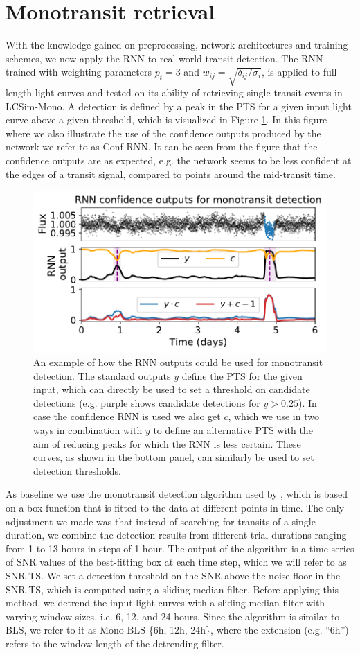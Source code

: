 \section{Monotransit retrieval}
\label{sec:monos}

With the knowledge gained on preprocessing, network architectures and training schemes, we now apply the RNN to real-world transit detection. The RNN trained with weighting parameters $p_t=3$ and $w_{ij} = \sqrt{\delta_{ij}/\sigma_i}$, is applied to full-length light curves and tested on its ability of retrieving single transit events in LCSim-Mono. A detection is defined by a peak in the PTS for a given input light curve above a given threshold, which is visualized in Figure \ref{fig:mono_example}. In this figure where we also illustrate the use of the confidence outputs produced by the network we refer to as Conf-RNN. It can be seen from the figure that the confidence outputs are as expected, e.g. the network seems to be less confident at the edges of a transit signal, compared to points around the mid-transit time.

\begin{figure}
    \centering
    \includegraphics[width=0.5\linewidth]{Experiments/Figures/Monos/mono_example.pdf}
    \caption{An example of how the RNN outputs could be used for monotransit detection. The standard outputs $y$ define the PTS for the given input, which can directly be used to set a threshold on candidate detections (e.g. purple shows candidate detections for $y >0.25$). In case the confidence RNN is used we also get $c$, which we use in two ways in combination with $y$ to define an alternative PTS with the aim of reducing peaks for which the RNN is less certain. These curves, as shown in the bottom panel, can similarly be used to set detection thresholds.}
    \label{fig:mono_example}
\end{figure}

As baseline we use the monotransit detection algorithm used by \cite{foreman2016population}, which is based on a box function that is fitted to the data at different points in time. The only adjustment we made was that instead of searching for transits of a single duration, we combine the detection results from different trial durations ranging from 1 to 13 hours in steps of 1 hour. The output of the algorithm is a time series of SNR values of the best-fitting box at each time step, which we will refer to as SNR-TS. We set a detection threshold on the SNR above the noise floor in the SNR-TS, which is computed using a sliding median filter. Before applying this method, we detrend the input light curves with a sliding median filter with varying window sizes, i.e. 6, 12, and 24 hours. Since the algorithm is similar to BLS, we refer to it as Mono-BLS-\{6h, 12h, 24h\}, where the extension (e.g. ``6h'') refers to the window length of the detrending filter.

